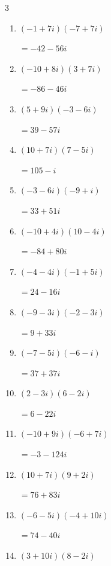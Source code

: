 \begin{multicols}{3}
\begin{enumerate}
  \item $\displaystyle (-1+7i)(-7+7i)$

        $\displaystyle =-42-56i$

  \item $\displaystyle (-10+8i)(3+7i)$

        $\displaystyle =-86-46i$

  \item $\displaystyle (5+9i)(-3-6i)$

        $\displaystyle =39-57i$

  \item $\displaystyle (10+7i)(7-5i)$

        $\displaystyle =105-i$

  \item $\displaystyle (-3-6i)(-9+i)$

        $\displaystyle =33+51i$

  \item $\displaystyle (-10+4i)(10-4i)$

        $\displaystyle =-84+80i$

  \item $\displaystyle (-4-4i)(-1+5i)$

        $\displaystyle =24-16i$

\columnbreak %

  \item $\displaystyle (-9-3i)(-2-3i)$

        $\displaystyle =9+33i$

  \item $\displaystyle (-7-5i)(-6-i)$

        $\displaystyle =37+37i$

  \item $\displaystyle (2-3i)(6-2i)$

        $\displaystyle =6-22i$

  \item $\displaystyle (-10+9i)(-6+7i)$

        $\displaystyle =-3-124i$

  \item $\displaystyle (10+7i)(9+2i)$

        $\displaystyle =76+83i$

  \item $\displaystyle (-6-5i)(-4+10i)$

        $\displaystyle =74-40i$

  \item $\displaystyle (3+10i)(8-2i)$


\end{enumerate}
\end{multicols}
